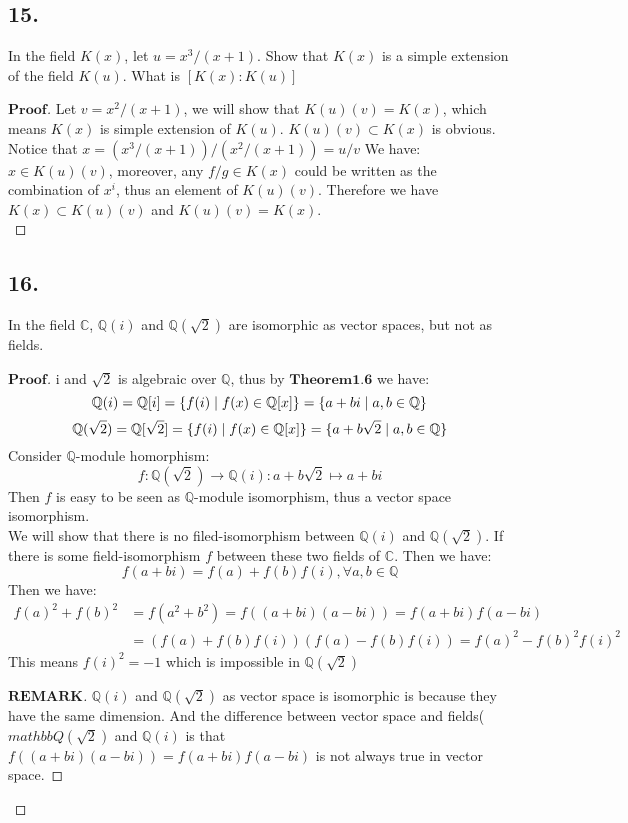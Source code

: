 \documentclass[a4paper, 11pt]{article}
\newenvironment{myprf}
{\renewcommand\qedsymbol{$ $}\begin{proof}[$\mathbf{Proof}$]}
  {\end{proof}}
\newenvironment{myremark}
{\renewcommand\qedsymbol{$ $}\begin{proof}[$\mathbf{REMARK}$]}
  {\end{proof}}
\begin{document}
 \subsection*{15.}
 In the field $K(x)$, let $u=x^3/(x+1)$. Show that $K(x)$ is a simple extension of the field $K(u)$. What is
 $[K(x):K(u)]$
 \begin{myprf}
         Let $v=x^2/(x+1)$, we will show that $K(u)(v)=K(x)$, which means $K(x)$ is simple extension of $K(u)$.
         $K(u)(v)\subset K(x)$ is obvious. Notice that $x=(x^3/(x+1))/(x^2/(x+1))=u/v$ We have:$x\in K(u)(v)$,
         moreover, any $f/g\in K(x)$ could be written as the combination of $x^i$, thus an element of $K(u)(v)$.
         Therefore we have $K(x)\subset K(u)(v)$ and $K(u)(v)=K(x)$.\\
 \end{myprf}

 \subsection*{16.}
 In the field $\mathbb{C}$, $\mathbb{Q}(i)$ and $\mathbb{Q}(\sqrt{2})$ are isomorphic as vector spaces, but not
 as fields.
 \begin{myprf}
         i and $\sqrt{2}$ is algebraic over $\mathbb{Q}$, thus by $\textbf{Theorem1.6}$ we have:
         $$
         \mathbb{Q}(i)=
         \mathbb{Q}[i]=\{f(i)\mid f(x)\in \mathbb{Q}[x]\}=\{a+bi\mid a,b\in \mathbb{Q}\} \\
         $$
         $$
         \mathbb{Q}(\sqrt{2})=
         \mathbb{Q}[\sqrt{2}]=\{f(i)\mid f(x)\in \mathbb{Q}[x]\}=\{a+b\sqrt{2}\mid a,b\in \mathbb{Q}\}\\
         $$ 
         Consider $\mathbb{Q}$-module homorphism:
         $$
         f:
         \mathbb{Q}(\sqrt{2})\rightarrow \mathbb{Q}(i):a+b\sqrt{2}
         \mapsto a+bi
         $$ Then $f$ is easy to be seen as $\mathbb{Q}$-module isomorphism, thus a vector space isomorphism.\\
         We will show that there is no filed-isomorphism between $\mathbb{Q}(i)$ and $\mathbb{Q}(\sqrt{2})$.
         If there is some field-isomorphism $f$ between these two fields of $\mathbb{C}$. Then we have:
         $$
         f(a+bi)=f(a)+f(b)f(i), \forall a,b\in \mathbb{Q}
         $$ Then we have:
         $$
         \begin{aligned}
                 f(a)^2+f(b)^2&=f(a^2+b^2)=f((a+bi)(a-bi))=f(a+bi)f(a-bi)\\&=(f(a)+f(b)f(i))(f(a)-f(b)f(i))=f(a)^2-f(b)^2f(i)^2
         \end{aligned}
         $$ This means $f(i)^2=-1$ which is impossible in $\mathbb{Q}(\sqrt{2})$
         \begin{myremark}
                 $\mathbb{Q}(i)$ and $\mathbb{Q}(\sqrt{2})$ as vector space is isomorphic is because they have
                 the same dimension. And the difference between vector space and fields($mathbb{Q}(\sqrt{2})$ and 
                 $\mathbb{Q}(i)$ is that 
                 $f((a+bi)(a-bi))=f(a+bi)f(a-bi)$ is not always true in vector space.
         \end{myremark}
 \end{myprf}
\end{document}
